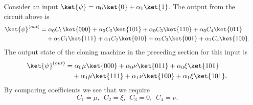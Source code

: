 \documentclass[reqno]{amsart}
\numberwithin{lemma}{section}
\numberwithin{proposition}{section}
\begin{document}
Consider an input $\ket{\psi} = \alpha_{0} \ket{0} + \alpha_{1} \ket{1}$. The output from the circuit above is
\begin{align*}
    \ket{\psi}^{(out)} &= \alpha_{0} C_{1} \ket{000} + \alpha_{0} C_{2} \ket{101} + \alpha_{0} C_{3} \ket{110} + \alpha_{0} C_{4} \ket{011} \\
    & \quad + \alpha_{1} C_{1} \ket{111} + \alpha_{1} C_{2} \ket{010} + \alpha_{1} C_{3} \ket{001} + \alpha_{1} C_{4} \ket{100}.
\end{align*}
The output state of the cloning machine in the preceding section for this input is
\begin{align*}
    \ket{\psi}^{(out)} &= \alpha_{0} \mu \ket{000} + \alpha_{0} \nu \ket{011} + \alpha_{0} \xi \ket{101} \\
    & \quad + \alpha_{1} \mu \ket{111} + \alpha_{1} \nu \ket{100} + \alpha_{1} \xi \ket{101}.
\end{align*}
By comparing coefficients we see that we require
\begin{equation*}
    C_{1} = \mu, \ \ C_{2} = \xi, \ \ C_{3} = 0, \ \ C_{4} = \nu.
\end{equation*}

\end{document}
